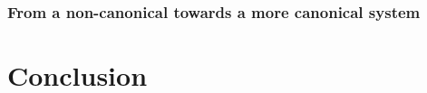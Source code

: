 \documentclass[twoside,a4paper,11pt]{article}
\newcommand{\Σ}{\greek{Σ}}
\begin{document}
\subsubsection{From a non-canonical towards a more canonical system}



\section{Conclusion}


 
 
\end{document}
